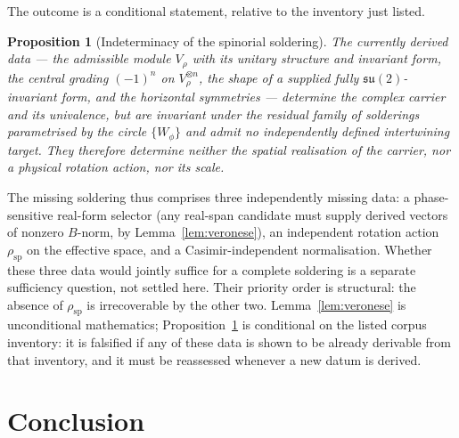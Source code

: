 \documentclass[11pt,a4paper]{article}
\newtheorem{proposition}{Proposition}
\begin{document}
The outcome is a conditional statement, relative to the inventory just listed.

\begin{proposition}[Indeterminacy of the spinorial soldering]
\label{prop:indeterminacy}
The currently derived data — the admissible module $V_\rho$ with its unitary structure and invariant
form, the central grading $(-1)^n$ on $V_\rho^{\otimes n}$, the shape of a supplied fully
$\mathfrak{su}(2)$-invariant form, and the horizontal symmetries — determine the complex carrier and its univalence, but are invariant
under the residual family of solderings parametrised by the circle $\{W_\phi\}$ and admit no
independently defined intertwining target.
They therefore determine neither the spatial realisation of the carrier, nor a physical rotation action,
nor its scale.
\end{proposition}

The missing soldering thus comprises three independently missing data: a phase-sensitive real-form
selector (any real-span candidate must supply derived vectors of nonzero $B$-norm, by
Lemma~\ref{lem:veronese}), an independent rotation action $\rho_{\mathrm{sp}}$ on the effective space,
and a Casimir-independent normalisation.
Whether these three data would jointly suffice for a complete soldering is a separate sufficiency
question, not settled here.
Their priority order is structural: the absence of $\rho_{\mathrm{sp}}$ is irrecoverable by the other
two.
Lemma~\ref{lem:veronese} is unconditional mathematics; Proposition~\ref{prop:indeterminacy} is
conditional on the listed corpus inventory: it is falsified if any of these data is shown to be already
derivable from that inventory, and it must be reassessed whenever a new datum is derived.

\section{Conclusion}
\label{sec:conclusion}
\end{document}
